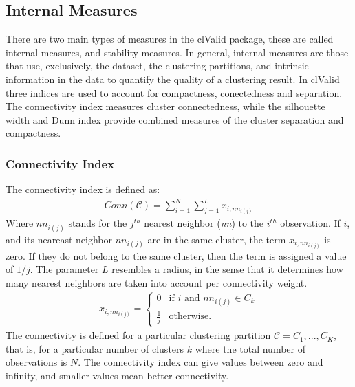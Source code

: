 \subsection{Internal Measures}
There are two main types of measures in the clValid package, these are
called internal measures, and stability measures. In general, internal
measures are those that  use, exclusively, the dataset, the clustering
partitions,  and intrinsic  information in  the data  to  quantify the
quality of a  clustering result. In clValid three  indices are used to
account for compactness, conectedness and separation. The connectivity
index measures  cluster connectedness, while the  silhouette width and
Dunn  index provide combined  measures of  the cluster  separation and
compactness.

\subsubsection{Connectivity Index}
The connectivity index is defined as:
\begin{gather}
Conn(\mathcal{C}) = \sum_{i=1}^{N}\sum_{j=1}^{L} x_{i,nn_{i(j)}}
\end{gather}
Where   $nn_{i(j)}$   stands  for   the   $j^{th}$  nearest   neighbor
(\textit{nn}) to  the $i^{th}$ observation.  If $i$,  and its neareast
neighbor   $nn_{i(j)}$   are   in   the   same   cluster,   the   term
$x_{i,nn_{i(j)}}$ is zero. If they  do not belong to the same cluster,
then  the  term is  assigned  a value  of  $1/j$.   The parameter  $L$
resembles a radius,  in the sense that it  determines how many nearest
neighbors are taken into account per connectivity weight.
\begin{gather}
x_{i,nn_{i(j)}} =
    \begin{cases}
      0           &  \text{if } i \text{ and } nn_{i(j)} \in C_{k} \\
      \frac{1}{j} &  \text{otherwise.}
    \end{cases}
\end{gather}  
The  connectivity is  defined  for a  particular clustering  partition
$\mathcal{C} =  {C_{1},..., C_{K}}$, that is, for  a particular number
of clusters $k$ where the total number of observations is $N$. 
The connectivity index can give values between zero and infinity,
and smaller values mean better connectivity.


